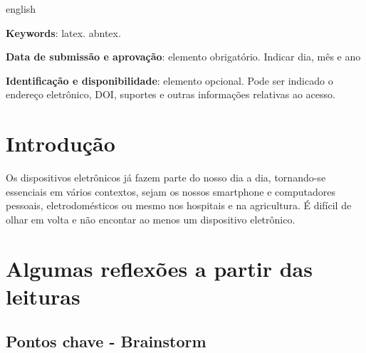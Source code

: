 \documentclass[
	article,			%
	11pt,				%
	oneside,			%
	a4paper,			%
	english,			%
	brazil,				%
	sumario=tradicional
	]{abntex2}
\begin{document}
\renewcommand{\resumoname}{Abstract}
\begin{resumoumacoluna}
 \begin{otherlanguage*}{english}
   

   \vspace{\onelineskip}
 
   \noindent
   \textbf{Keywords}: latex. abntex.
 \end{otherlanguage*}  
\end{resumoumacoluna}


\begin{center}\smaller
\textbf{Data de submissão e aprovação}: elemento obrigatório. Indicar dia, mês e ano

\textbf{Identificação e disponibilidade}: elemento opcional. Pode ser indicado o endereço eletrônico, DOI, suportes e outras informações relativas ao acesso.
\end{center}

\textual

\section{Introdução}

Os dispositivos eletrônicos já fazem parte do nosso dia a dia, tornando-se essenciais em vários contextos, sejam os nossos smartphone e computadores pessoais, eletrodomésticos ou mesmo nos hospitais e na agricultura.  É difícil de olhar em volta e não encontar ao menos um dispositivo eletrônico. 

\section{Algumas reflexões a partir das leituras}

\subsection{Pontos chave - Brainstorm}
\end{document}
